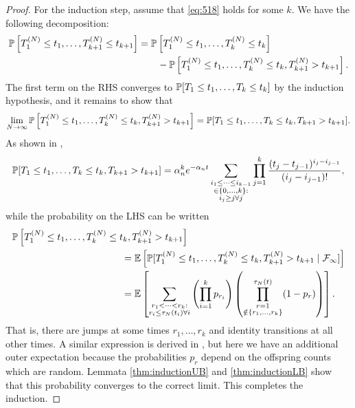 \begin{proof}
For the induction step, assume that \eqref{eq:518} holds for some $k$. 
We have the following decomposition:
\begin{align*}
\mathbb{P}\left[ T_1^{(N)} \leq t_1, \dots , T_{k+1}^{(N)} \leq t_{k+1} \right]
&= \mathbb{P}\left[ T_1^{(N)} \leq t_1, \dots , T_k^{(N)} \leq t_k \right] \\
        &\qquad- \mathbb{P}\left[ T_1^{(N)} \leq t_1, \dots , T_k^{(N)} \leq t_k, T_{k+1}^{(N)} > t_{k+1} \right] .
\end{align*}
The first term on the RHS converges to $\mathbb{P}[ T_1 \leq t_1, \dots , T_k \leq t_k ]$ by the induction hypothesis, and it remains to show that
\begin{equation*}
\lim_{N\to\infty} 
        \mathbb{P}\left[ T_1^{(N)} \leq t_1, \dots , T_k^{(N)} \leq t_k, T_{k+1}^{(N)} > t_{k+1} \right]
= \mathbb{P}[ T_1\leq t_1, \dots , T_k \leq t_k, T_{k+1} > t_{k+1} ] .
\end{equation*}
As shown in \textcite{mohle1999},
\begin{equation*}
\mathbb{P}[ T_1\leq t_1, \dots , T_k \leq t_k, T_{k+1} > t_{k+1} ]
= \alpha_n^k e^{-\alpha_n t} 
        \sum_{\substack{i_1\leq \dots\leq i_{k-1}\\ \in \{0,\dots,k\} :
        \\ i_j \geq j \forall j}} 
        \prod_{j=1}^k \frac{(t_j - t_{j-1})^{i_j - i_{j-1}}}{(i_j - i_{j-1})! } ,
\end{equation*}
while the probability on the LHS can be written
\begin{align*}
&\Prob\left[ T_1^{(N)} \leq t_1, \dots , T_k^{(N)} \leq t_k, T_{k+1}^{(N)} > t_{k+1} \right] \\
&\hspace{4cm}= \E\left[ \Prob[ T_1^{(N)} \leq t_1, \dots , T_k^{(N)} \leq t_k, T_{k+1}^{(N)} > t_{k+1} 
        \mid \mathcal{F}_\infty] \right] \\
&\hspace{4cm}= \E \left[ \sum_{\substack{r_1 <\dots< r_k :
        \\ r_i \leq \tau_N(t_i) \forall i}}
        \left( \prod_{i=1}^k p_{r_i} \right)
        \left( \prod_{\substack{r=1 \\ \notin \{r_1,\dots,r_k\} }}^{\tau_N(t)} 
        (1-p_r) \right) \right] .
\end{align*}
That is, there are jumps at some times $r_1, \dots, r_k$ and identity transitions at all other times.
A similar expression is derived in \textcite{mohle1999}, but here we have an additional outer expectation because the probabilities $p_r$ depend on the offspring counts which are random.
Lemmata \ref{thm:inductionUB} and \ref{thm:inductionLB} show that this probability converges to the correct limit.
This completes the induction.
\end{proof}


